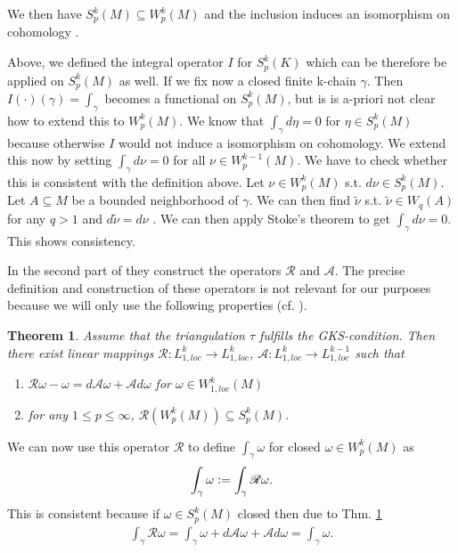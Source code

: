 \documentclass[12pt,a4paper]{article}
\newtheorem{theorem}{Theorem}
\theoremstyle{definition}
\newcommand{\rop}{\mathscr{R}} %
\begin{document}
We then have $S^k_p(M) \subseteq W^k_p(M)$ and the inclusion induces an
isomorphism on cohomology \cite[Lemma 4, Corollary]{goldshtein}. 


Above, we defined the integral operator $I$ for $S^k_p(K)$ which can be 
therefore be applied on $S^k_p(M)$ as well. If we fix now a closed finite 
k-chain $\gamma$. Then $I(\cdot)(\gamma) = \int_\gamma$ becomes a functional on
$S^k_p(M)$, but is is a-priori not clear how to extend this to $W_p^k(M)$. 
We know that $\int_\gamma d\eta = 0$ for $\eta \in S^k_p(M)$ because 
otherwise $I$ would not induce a isomorphism on cohomology. We extend this now
by setting $\int_\gamma d\nu = 0$ for all $\nu \in W^{k-1}_p(M)$. 
We have to check whether this is consistent with the definition above. 
Let $\nu \in W_p^k(M)$ s.t. $d\nu \in S^k_p(M)$. Let $A \subseteq M$ be a 
bounded neighborhood of $\gamma$. We can then find 
$\tilde{\nu}$ s.t.  $\tilde{\nu} \in W_q(A)$ for any $q > 1$ and 
$d\tilde{\nu} = d\nu$ \cite[Thm 3.1.1]{schwarz}. We can then apply 
Stoke's theorem \cite[Thm. 9]{goldshtein_integration} to get  
$\int_\gamma d\nu = 0$. This shows consistency.

In the second part of \cite{goldshtein} they construct the operators
$\mathscr{R}$ and $\mathscr{A}$. The precise definition and construction of
these operators is not relevant for our purposes because we will only use
the following properties (cf. \cite[Thm.2]{goldshtein}).

\begin{theorem}\label{operators}
    Assume that the triangulation $\tau$ fulfills the GKS-condition.
    Then there exist linear mappings $\mathscr{R}: L^k_{1,loc} \rightarrow 
    L^k_{1,loc}$, $\mathscr{A}: L^k_{1,loc} \rightarrow L^{k-1}_{1,loc}$ 
    such that
    \begin{enumerate}
        \item $\mathscr{R}\omega - \omega = 
            d\mathscr{A}\omega + \mathscr{A}d\omega$ for 
            $\omega \in W^k_{1,loc}(M)$
        \item for any $1 \leq p \leq \infty$, 
            $\rop(W^k_p(M)) \subseteq S^k_p(M)$.
    \end{enumerate}
\end{theorem}

We can now use this operator $\rop$ to define $\int_\gamma \omega$ for closed
$\omega \in W^k_p(M)$ as
\begin{align*}
\int_\gamma \omega \vcentcolon= \int_\gamma \rop\omega.
\end{align*}
This is consistent because if $\omega \in S^k_p(M)$ closed then due to 
Thm. \ref{operators}
\begin{align*}
\int_\gamma \rop\omega = 
\int_\gamma \omega + d\mathscr{A}\omega + \mathscr{A}d\omega = 
\int_\gamma \omega.
\end{align*}
\end{document}
